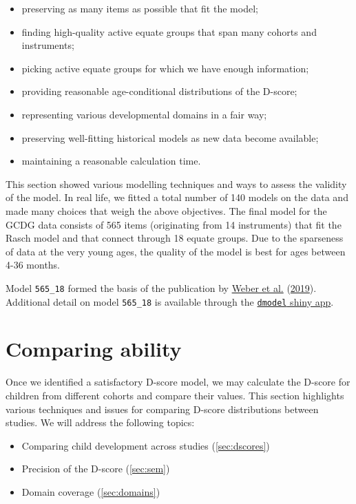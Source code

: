 \documentclass[
]{book}
\providecommand{\tightlist}{%
  \setlength{\itemsep}{0pt}\setlength{\parskip}{0pt}}
\begin{document}
\begin{itemize}
\tightlist
\item
  preserving as many items as possible that fit the model;
\item
  finding high-quality active equate groups that span many cohorts and instruments;
\item
  picking active equate groups for which we have enough information;
\item
  providing reasonable age-conditional distributions of the D-score;
\item
  representing various developmental domains in a fair way;
\item
  preserving well-fitting historical models as new data become available;
\item
  maintaining a reasonable calculation time.
\end{itemize}

This section showed various modelling techniques and ways to assess the validity of the model. In real life, we fitted a total number of 140 models on the data and made many choices that weigh the above objectives. The final model for the GCDG data consists of 565 items (originating from 14 instruments) that fit the Rasch model and that connect through 18 equate groups. Due to the sparseness of data at the very young ages, the quality of the model is best for ages between 4-36 months.

Model \texttt{565\_18} formed the basis of the publication by \protect\hyperlink{ref-Weber2019}{Weber et al.} (\protect\hyperlink{ref-Weber2019}{2019}). Additional detail on model \texttt{565\_18} is available through the \href{https://tnochildhealthstatistics.shinyapps.io/dmodel/}{\texttt{dmodel} shiny app}.

\hypertarget{ch:ability}{%
\chapter{Comparing ability}\label{ch:ability}}

Once we identified a satisfactory D-score model, we may calculate the D-score for children from different cohorts and compare their values. This section highlights various techniques and issues for comparing D-score distributions between studies. We will address the following topics:

\begin{itemize}
\tightlist
\item
  Comparing child development across studies (\ref{sec:dscores})
\item
  Precision of the D-score (\ref{sec:sem})
\item
  Domain coverage (\ref{sec:domains})
\end{itemize}
\end{document}
